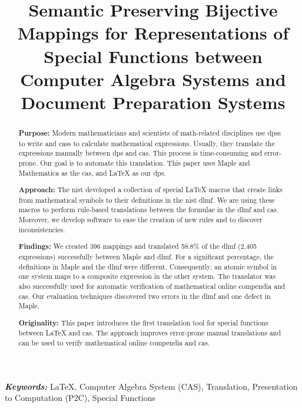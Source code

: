 \documentclass[a4paper,11pt]{article}
\title{
    Semantic Preserving Bijective Mappings for Representations of Special Functions between Computer Algebra Systems and Document Preparation Systems
}
\date{}
\newcommand{\Maple}{Maple}
\newcommand{\Mathematica}{Mathematica}
\theoremstyle{defTheoStyle}
\theoremstyle{defExampStyle}
\begin{document}
\maketitle
\begin{abstract}
\glsresetall
\noindent
\textbf{Purpose:} Modern mathematicians and scientists of math-related disciplines use \glspl*{dps} to write and \glspl*{cas} to calculate mathematical expressions. Usually, they translate the expressions manually between \gls*{dps} and \gls*{cas}. This process is time-consuming and error-prone. Our goal is to automate this translation. This paper uses \Maple{} and \Mathematica{} as the \gls*{cas}, and \LaTeX{} as our \gls*{dps}.
 
\noindent\textbf{Approach:} The \gls*{nist} developed a collection of special \LaTeX{} macros that create links from mathematical symbols to their definitions in the \gls*{nist} \gls*{dlmf}. We are using these macros to perform rule-based translations between the formulae in the \gls*{dlmf} and \gls*{cas}. Moreover, we develop software to ease the creation of new rules and to discover inconsistencies.
 
\noindent\textbf{Findings:} We created 396 mappings and translated 58.8\% of the \gls*{dlmf} (2,405 expressions) successfully between \Maple{} and \gls*{dlmf}. For a significant percentage, the definitions in \Maple{} and the \gls*{dlmf} were different. Consequently, an atomic symbol in one system maps to a composite expression in the other system. The translator was also successfully used for automatic verification of mathematical online compendia and \gls*{cas}. Our evaluation techniques discovered two errors in the \gls*{dlmf} and one defect in \Maple.
 
\noindent\textbf{Originality:} This paper introduces the first translation tool for special functions between \LaTeX{} and \gls*{cas}. The approach improves error-prone manual translations and can be used to verify mathematical online compendia and \gls*{cas}.
\end{abstract} \glsresetall

\noindent
{\it \bf Keywords:} \LaTeX, Computer Algebra System (CAS), Translation, Presentation to Computation (P2C), Special Functions
\end{document}
